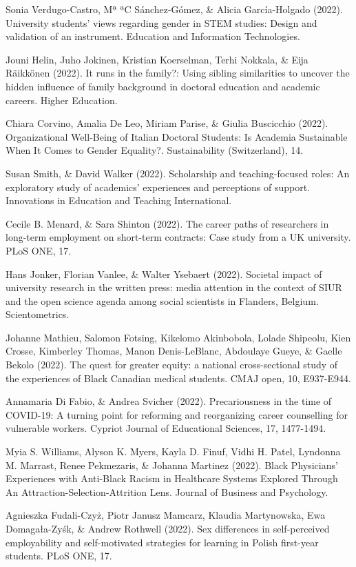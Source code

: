 \documentclass[runningheads]{llncs}
\begin{document}
\begin{multicols}{2}
Sonia Verdugo-Castro, Mª ªC Sánchez-Gómez, \& Alicia García-Holgado (2022). University students’ views regarding gender in STEM studies: Design and validation of an instrument. Education and Information Technologies.

Jouni Helin, Juho Jokinen, Kristian Koerselman, Terhi Nokkala, \& Eĳa Räikkönen (2022). It runs in the family?: Using sibling similarities to uncover the hidden influence of family background in doctoral education and academic careers. Higher Education.

Chiara Corvino, Amalia De Leo, Miriam Parise, \& Giulia Buscicchio (2022). Organizational Well-Being of Italian Doctoral Students: Is Academia Sustainable When It Comes to Gender Equality?. Sustainability (Switzerland), 14.

Susan Smith, \& David Walker (2022). Scholarship and teaching-focused roles: An exploratory study of academics’ experiences and perceptions of support. Innovations in Education and Teaching International.

Cecile B. Menard, \& Sara Shinton (2022). The career paths of researchers in long-term employment on short-term contracts: Case study from a UK university. PLoS ONE, 17.

Hans Jonker, Florian Vanlee, \& Walter Ysebaert (2022). Societal impact of university research in the written press: media attention in the context of SIUR and the open science agenda among social scientists in Flanders, Belgium. Scientometrics.

Johanne Mathieu, Salomon Fotsing, Kikelomo Akinbobola, Lolade Shipeolu, Kien Crosse, Kimberley Thomas, Manon Denis-LeBlanc, Abdoulaye Gueye, \& Gaelle Bekolo (2022). The quest for greater equity: a national cross-sectional study of the experiences of Black Canadian medical students. CMAJ open, 10, E937-E944.

Annamaria Di Fabio, \& Andrea Svicher (2022). Precariousness in the time of COVID-19: A turning point for reforming and reorganizing career counselling for vulnerable workers. Cypriot Journal of Educational Sciences, 17, 1477-1494.

Myia S. Williams, Alyson K. Myers, Kayla D. Finuf, Vidhi H. Patel, Lyndonna M. Marrast, Renee Pekmezaris, \& Johanna Martinez (2022). Black Physicians’ Experiences with Anti-Black Racism in Healthcare Systems Explored Through An Attraction-Selection-Attrition Lens. Journal of Business and Psychology.

Agnieszka Fudali-Czyż, Piotr Janusz Mamcarz, Klaudia Martynowska, Ewa Domagała-Zyśk, \& Andrew Rothwell (2022). Sex differences in self-perceived employability and self-motivated strategies for learning in Polish first-year students. PLoS ONE, 17.


\end{multicols}
\end{document}
